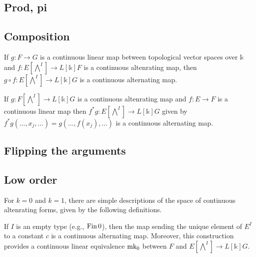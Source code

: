 \subsection{Prod, pi}%
\label{sec:prod-pi}


\subsection{Composition}%
\label{sec:composition}

\begin{theorem}%
  \label{thm:clm-comp}
  If \(g\colon F \to G\) is a continuous linear map between topological vector spaces over \(\mathbb k\)
  and \(f\colon E [\bigwedge^{I}]\to L[\mathbb k] F\) is a continuous altenrating map,
  then \(g \circ f\colon E [\bigwedge^{I}]\to L[\mathbb k] G\) is a continuous alternating map.
\end{theorem}

\begin{theorem}%
  \label{thm:comp-clm}
  If \(g\colon F [\bigwedge^{I}]\to L[\mathbb k] G\) is a continuous altenrating map
  and \(f\colon E \to F\) is a continuous linear map
  then \(f^{*}g \colon E [\bigwedge^{I}]\to L[\mathbb k] G\) given by \(f^{*}g(\dots, x_{j}, \dots) = g (\dots, f(x_{j}), \dots)\) is a continuous alternating map.
\end{theorem}

\subsection{Flipping the arguments}%
\label{sec:flipping-arguments}


\subsection{Low order}%
\label{sec:low-order}

For \(k = 0\) and \(k = 1\), there are simple descriptions of the space of continuous altenrating forms,
given by the following definitions.

\begin{definition}%
  \label{def:cont-alt-map-zero}
  If \(I\) is an empty type (e.g., \(\operatorname{Fin} 0\)),
  then the map sending the unique element of \(E^{I}\) to a constant \(c\)
  is a continuous alternating map.
  Moreover, this construction provides a continuous linear equivalence \(\operatorname{mk_0}\)
  between \(F\) and \(E [\bigwedge^{I}]\to L[\mathbb k] G\).
\end{definition}

